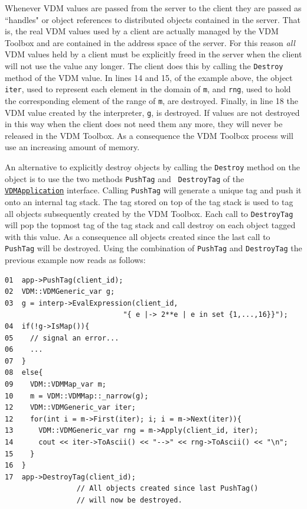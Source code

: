 \documentclass[\pformat,12pt]{article}
\newcommand{\VDMApplication}{\hyperlink{interface.VDMApplication}{VDMApplication}}
\begin{document}
Whenever VDM values are passed from the server to the client they are
passed as ``handles" or object references to distributed objects
contained in the server. That is, the real VDM values used by a client
are actually managed by the VDM Toolbox and are contained in the address
space of the server. For this reason {\em all} VDM values held by a
client must be 
explicitly freed in the server when the client will not use the value
any longer. The client does this by calling the {\tt Destroy} method
of the VDM value. In lines 14 and 15, of the example above, the object
{\tt iter}, used to represent each element in the domain of {\tt m},
and {\tt rng}, used to hold the corresponding element of the range of
{\tt m}, are destroyed. Finally, in line 18 the VDM value created by
the interpreter, {\tt g}, is destroyed. If values are not destroyed in this
way when the client does not need them any more, they will never be
released in the VDM Toolbox. As a consequence the VDM Toolbox process
will use an increasing amount of memory.  

An alternative to explicitly destroy objects by calling the {\tt Destroy}
method on the object is to use the two methods {\tt PushTag} and {\tt
  DestroyTag} 
of the {\tt \VDMApplication} interface. Calling {\tt PushTag} will generate a
unique tag and push it onto an internal tag stack. The tag stored on
top of the tag stack is used to tag all objects subsequently created
by the VDM Toolbox. Each call to {\tt DestroyTag} will pop the topmost tag
of the tag stack and call destroy on each object tagged with this
value. As a consequence all objects created since the last call to
{\tt PushTag} will be destroyed.  Using the combination of {\tt PushTag} and
{\tt DestroyTag} the previous example now reads as follows:

\begin{verbatim}
01  app->PushTag(client_id);
02  VDM::VDMGeneric_var g;
03  g = interp->EvalExpression(client_id, 
                            "{ e |-> 2**e | e in set {1,...,16}}");
04  if(!g->IsMap()){
05    // signal an error...
06    ...
07  }
08  else{
09    VDM::VDMMap_var m;
10    m = VDM::VDMMap::_narrow(g);
12    VDM::VDMGeneric_var iter;
12    for(int i = m->First(iter); i; i = m->Next(iter)){
13      VDM::VDMGeneric_var rng = m->Apply(client_id, iter);
14      cout << iter->ToAscii() << "-->" << rng->ToAscii() << "\n"; 
15    }
16  }
17  app->DestroyTag(client_id); 
                 // All objects created since last PushTag()
                 // will now be destroyed.
\end{verbatim}
\end{document}
